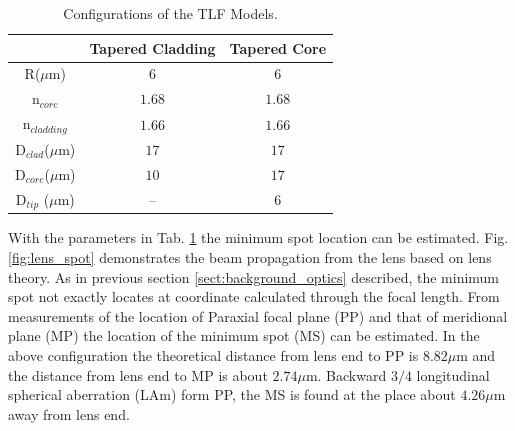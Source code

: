 \begin{table}[!ht]
\caption{Configurations of the TLF Models.}
\centering
\begin{tabular}{ccc}
\hline
							&Tapered Cladding&Tapered Core\\
\hline
R($\mu$m) & $6$						 &$6$	\\
n$_{core}$&$1.68$&$1.68$\\
n$_{cladding}$&$1.66$&$1.66$\\
D$_{clad}$($\mu$m) &	$17$ &	$17$\\
D$_{core}$($\mu$m) & $10$ &	$17$\\
D$_{tip}$ ($\mu$m) & --   &	$6$\\
\hline
\end{tabular}
\label{tab:model_fiber_configuration}
\end{table}
With the parameters in Tab. \ref{tab:model_fiber_configuration} the minimum spot location can be estimated. Fig. \ref{fig:lens_spot} demonstrates the beam propagation from the lens based on lens theory. As in previous section \ref{sect:background_optics} described, the minimum spot not exactly locates at coordinate calculated through the focal length. From measurements of the location of Paraxial focal plane (PP) and that of meridional plane (MP) the location of the minimum spot (MS) can be estimated. In the above configuration the theoretical distance from lens end to PP is $8.82 \mu$m and the distance from lens end to MP is about $2.74 \mu$m. Backward $3/4$ longitudinal spherical aberration (LAm) form PP, the MS is found at the place about $4.26 \mu$m away from lens end. \\ 

